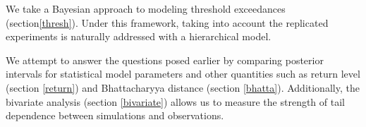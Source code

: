 
We take a Bayesian approach to modeling threshold exceedances (section\ref{thresh}). Under this framework, taking into account the replicated experiments is naturally addressed with a hierarchical model.

We attempt to answer the questions posed earlier by comparing posterior intervals for statistical model parameters and other quantities such as return level (section \ref{return}) and Bhattacharyya distance (section \ref{bhatta}). Additionally, the bivariate analysis (section \ref{bivariate}) allows us to measure the strength of tail dependence between simulations and observations.


